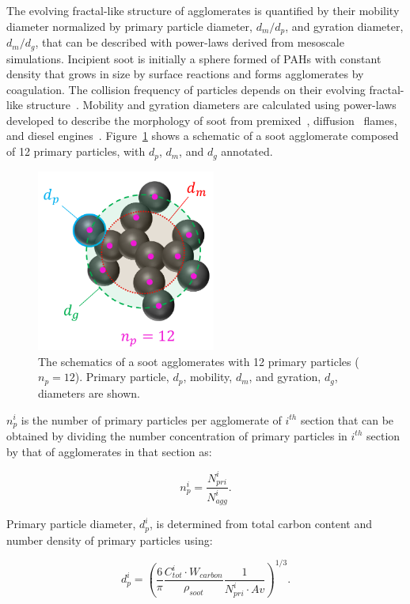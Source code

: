 The evolving fractal-like structure of agglomerates is quantified by their mobility diameter normalized by primary particle diameter, $d_m/d_p$, and gyration diameter, $d_m/d_g$, that can be described with power-laws derived from mesoscale simulations.
Incipient soot is initially a sphere formed of PAHs with constant density that grows in size by surface reactions and forms agglomerates by coagulation. The collision frequency of particles depends on their evolving fractal-like structure~\citep{mulholland1988cluster}.
Mobility and gyration diameters are calculated using power-laws developed to describe the morphology of soot from premixed~\citep{abid2008evolution}, diffusion~\citep{yon2015simple} flames, and diesel engines~\citep{rissler2013effective}. Figure~\ref{fig:Morphology} shows a schematic of a soot agglomerate composed of 12 primary particles, with ${d_p}$, ${d_m}$, and ${d_g}$ annotated.
\begin{figure}[!htbp]
	\centering
	\includegraphics[height=60mm, ]{Figures/Theory/Morphology.pdf}
	\caption{The schematics of a soot agglomerates with 12 primary particles (${n_p=12}$). Primary particle, ${d_p}$, mobility, ${d_m}$, and gyration, ${d_g}$, diameters are shown.}
	\label{fig:Morphology}
\end{figure} 


${n^i_p}$ is the number of primary particles per agglomerate of ${i^{th}}$ section that can be obtained by dividing the number concentration of primary particles in ${i^{th}}$ section by that of agglomerates in that section as:

\begin{equation}
	n^i_p = \frac{N^i_{pri}}{N^i_{agg}}
	\label{eqn:n_p}.
\end{equation}

Primary particle diameter, ${d^i_p}$, is determined from total carbon content and number density of primary particles using:

\begin{equation}
	d^i_p = \left(\frac{6}{\pi} \frac{C^i_{tot}\cdot W_{carbon}}{\rho_{soot}} \frac{1}{N^i_{pri}\cdot Av} \right)^{1/3}.
	\label{eqn:d_p}
\end{equation}

